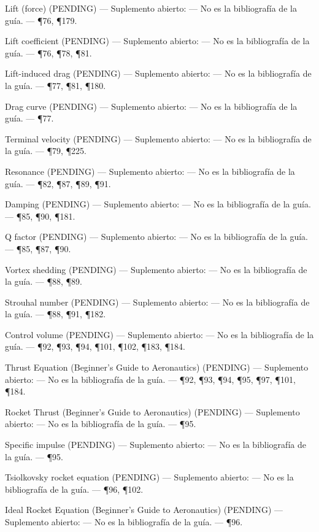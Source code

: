 \documentclass[10pt,openany]{book}
\begin{document}
\noindent Lift (force) (PENDING) --- Suplemento abierto: --- No es la bibliografía de la guía. --- \P76, \P179.\par
\noindent Lift coefficient (PENDING) --- Suplemento abierto: --- No es la bibliografía de la guía. --- \P76, \P78, \P81.\par
\noindent Lift-induced drag (PENDING) --- Suplemento abierto: --- No es la bibliografía de la guía. --- \P77, \P81, \P180.\par
\noindent Drag curve (PENDING) --- Suplemento abierto: --- No es la bibliografía de la guía. --- \P77.\par
\noindent Terminal velocity (PENDING) --- Suplemento abierto: --- No es la bibliografía de la guía. --- \P79, \P225.\par
\noindent Resonance (PENDING) --- Suplemento abierto: --- No es la bibliografía de la guía. --- \P82, \P87, \P89, \P91.\par
\noindent Damping (PENDING) --- Suplemento abierto: --- No es la bibliografía de la guía. --- \P85, \P90, \P181.\par
\noindent Q factor (PENDING) --- Suplemento abierto: --- No es la bibliografía de la guía. --- \P85, \P87, \P90.\par
\noindent Vortex shedding (PENDING) --- Suplemento abierto: --- No es la bibliografía de la guía. --- \P88, \P89.\par
\noindent Strouhal number (PENDING) --- Suplemento abierto: --- No es la bibliografía de la guía. --- \P88, \P91, \P182.\par
\noindent Control volume (PENDING) --- Suplemento abierto: --- No es la bibliografía de la guía. --- \P92, \P93, \P94, \P101, \P102, \P183, \P184.\par
\noindent Thrust Equation (Beginner's Guide to Aeronautics) (PENDING) --- Suplemento abierto: --- No es la bibliografía de la guía. --- \P92, \P93, \P94, \P95, \P97, \P101, \P184.\par
\noindent Rocket Thrust (Beginner's Guide to Aeronautics) (PENDING) --- Suplemento abierto: --- No es la bibliografía de la guía. --- \P95.\par
\noindent Specific impulse (PENDING) --- Suplemento abierto: --- No es la bibliografía de la guía. --- \P95.\par
\noindent Tsiolkovsky rocket equation (PENDING) --- Suplemento abierto: --- No es la bibliografía de la guía. --- \P96, \P102.\par
\noindent Ideal Rocket Equation (Beginner's Guide to Aeronautics) (PENDING) --- Suplemento abierto: --- No es la bibliografía de la guía. --- \P96.\par
\end{document}
